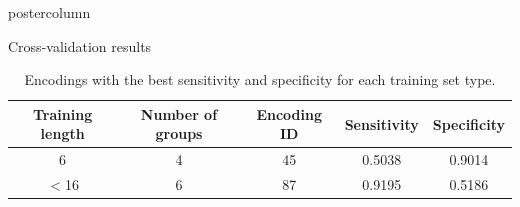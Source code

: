 \documentclass[final]{beamer}\usepackage[]{graphicx}\usepackage[]{color}
\begin{document}
\begin{frame}
\begin{columns}
\begin{column}{.51\textwidth}
\begin{beamercolorbox}[center,wd=\textwidth]{postercolumn}
\begin{minipage}[T]{.95\textwidth}
{%

\begin{block}{Cross-validation results}
\begin{table}[ht]
\centering
\caption{Encodings with the best sensitivity and specificity for each training set type.} 
\begin{tabular}{c|c|c|c|c}
  \toprule
Training length & Number of groups & Encoding ID & Sensitivity & Specificity \\ 
  \midrule
6 & 4 & 45 & 0.5038 & 0.9014 \\ 
   \rowcolor[gray]{0.75}$<$16 & 6 & 87 & 0.9195 & 0.5186 \\ 
   \bottomrule
\end{tabular}
\end{table}




\end{block}}
\end{minipage}
\end{beamercolorbox}
\end{column}
\end{columns}
\end{frame}
\end{document}
